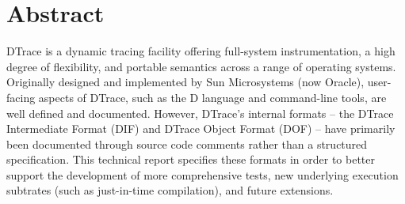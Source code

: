 \section*{Abstract}

DTrace is a dynamic tracing facility offering full-system instrumentation, a
high degree of flexibility, and portable semantics across a range of
operating systems.
Originally designed and implemented by Sun Microsystems (now Oracle),
user-facing aspects of DTrace, such as the D language and command-line tools,
are well defined and documented.
However, DTrace's internal formats -- the DTrace Intermediate Format (DIF) and
DTrace Object Format (DOF) -- have primarily been documented through source
code comments rather than a structured specification.
This technical report specifies these formats in order to better support the
development of more comprehensive tests, new underlying execution subtrates
(such as just-in-time compilation), and future extensions.
